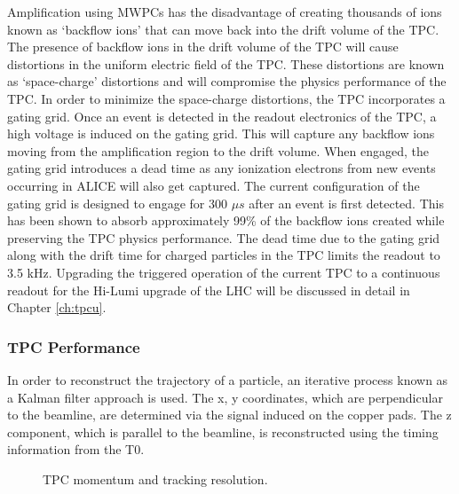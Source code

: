 Amplification using MWPCs has the disadvantage of creating thousands of ions known as `backflow ions' that can move back into the drift volume of the TPC.  The presence of backflow ions in the drift volume of the TPC will cause distortions in the uniform electric field of the TPC.  These distortions are known as `space-charge' distortions and will compromise the physics performance of the TPC.  In order to minimize the space-charge distortions, the TPC incorporates a gating grid\cite{Tangwancharoen:2016dqs}.  Once an event is detected in the readout electronics of the TPC, a high voltage is induced on the gating grid.  This will capture any backflow ions moving from the amplification region to the drift volume.  When engaged, the gating grid introduces a dead time as any ionization electrons from new events occurring in ALICE will also get captured.  The current configuration of the gating grid is designed to engage for 300 $\mu s$ after an event is first detected.  This has been shown to absorb approximately 99\% of the backflow ions created while preserving the TPC physics performance.  The dead time due to the gating grid along with the drift time for charged particles in the TPC limits the readout to 3.5 kHz.  Upgrading the triggered operation of the current TPC to a continuous readout for the Hi-Lumi upgrade of the LHC will be discussed in detail in Chapter \ref{ch:tpcu}.

\subsubsection{TPC Performance}\label{sec:tpcper}

In order to reconstruct the trajectory of a particle, an iterative process known as a Kalman filter approach is used.  The x, y coordinates, which are perpendicular to the beamline, are determined via the signal induced on the copper pads.  The z component, which is parallel to the beamline, is reconstructed using the timing information from the T0.  

\begin{figure}[h]
   \centering
   \caption{TPC momentum and tracking resolution\cite{Abelev:2014ffa}.}
   \label{fig:multipart-TPC}
\end{figure}


